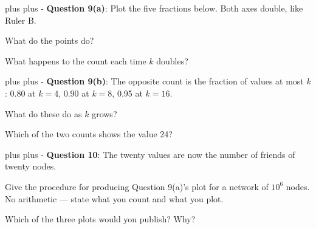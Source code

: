 \documentclass[a4paper, 14pt]{extarticle}
\newcommand{\needroom}[1]{%
  \par
  \begingroup
    \setlength{\dimen0}{#1}%
    \vskip 0pt plus \dimen0
    \penalty -100%
    \vskip 0pt plus -\dimen0
  \endgroup}
\begin{document}
\needroom{5\baselineskip}%
{\bf Question 9(a)}: Plot the five fractions below. Both axes double, like
Ruler B.

\vspace{0.3em}
\begin{center}
\resizebox{0.95\textwidth}{!}{\ccdfgrid{}}
\end{center}

\vspace{0.2em}
What do the points do?

What happens to the count each time $k$ doubles?

\needroom{5\baselineskip}%
{\bf Question 9(b)}: The opposite count is the fraction of values at most $k$:
0.80 at $k = 4$, 0.90 at $k = 8$, 0.95 at $k = 16$.

What do these do as $k$ grows?

Which of the two counts shows the value 24?

\needroom{5\baselineskip}%
{\bf Question 10}: The twenty values are now the number of friends of twenty
nodes.

Give the procedure for producing Question 9(a)'s plot for a network of
$10^6$ nodes. No arithmetic --- state what you count and what you plot.

Which of the three plots would you publish? Why?
\end{document}
